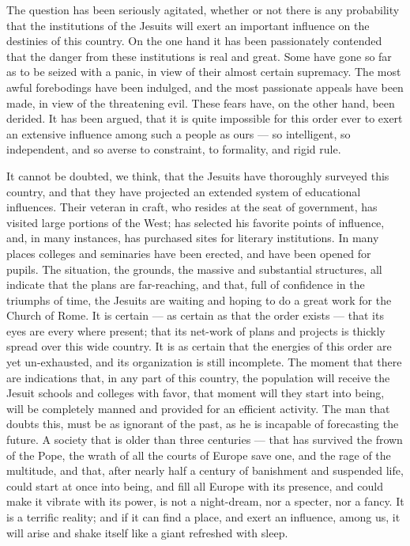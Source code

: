 \documentclass[]{book}
\begin{document}
The question has been seriously agitated, whether or not there is any probability that the institutions of the Jesuits will exert an important influence on the destinies of this country. On the one hand it has been passionately contended that the danger from these institutions is real and great. Some have gone so far as to be seized with a panic, in view of their almost certain supremacy. The most awful forebodings have been indulged, and the most passionate appeals have been made, in view of the threatening evil. These fears have, on the other hand, been derided. It has been argued, that it is quite impossible for this order ever to exert an extensive influence among such a people as ours --- so intelligent, so independent, and so averse to constraint, to formality, and rigid rule.

It cannot be doubted, we think, that the Jesuits have thoroughly surveyed this country, and that they have projected an extended system of educational influences. Their veteran in craft, who resides at the seat of government, has visited large portions of the West; has selected his favorite points of influence, and, in many instances, has purchased sites for literary institutions. In many places colleges and seminaries have been erected, and have been opened for pupils. The situation, the grounds, the massive and substantial structures, all indicate that the plans are far-reaching, and that, full of confidence in the triumphs of time, the Jesuits are waiting and hoping to do a great work for the Church of Rome. It is certain --- as certain as that the order exists --- that its eyes are every where present; that its net-work of plans and projects is thickly spread over this wide country. It is as certain that the energies of this order are yet un-exhausted, and its organization is still incomplete. The moment that there are indications that, in any part of this country, the population will receive the Jesuit schools and colleges with favor, that moment will they start into being, will be completely manned and provided for an efficient activity. The man that doubts this, must be as ignorant of the past, as he is incapable of forecasting the future. A society that is older than three centuries --- that has survived the frown of the Pope, the wrath of all the courts of Europe save one, and the rage of the multitude, and that, after nearly half a century of banishment and suspended life, could start at once into being, and fill all Europe with its presence, and could make it vibrate with its power, is not a night-dream, nor a specter, nor a fancy. It is a terrific reality; and if it can find a place, and exert an influence, among us, it will arise and shake itself like a giant refreshed with sleep.
\end{document}
